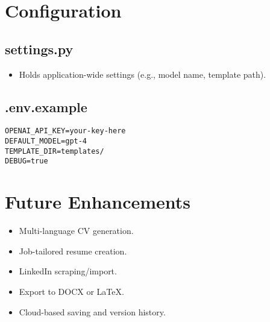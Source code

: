 \documentclass[11pt]{article}
\begin{document}
\section{Configuration}

\subsection{settings.py}
\begin{itemize}
    \item Holds application-wide settings (e.g., model name, template path).
\end{itemize}

\subsection{.env.example}
\begin{verbatim}
OPENAI_API_KEY=your-key-here
DEFAULT_MODEL=gpt-4
TEMPLATE_DIR=templates/
DEBUG=true
\end{verbatim}

\section{Future Enhancements}
\begin{itemize}
    \item Multi-language CV generation.
    \item Job-tailored resume creation.
    \item LinkedIn scraping/import.
    \item Export to DOCX or LaTeX.
    \item Cloud-based saving and version history.
\end{itemize}
\end{document}

